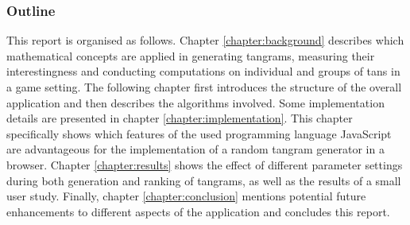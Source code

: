 \subsubsection*{Outline}

This report is organised as follows. Chapter \ref{chapter:background} describes which mathematical concepts are applied in generating tangrams, measuring their interestingness and conducting computations on individual and groups of tans in a game setting. The following chapter first introduces the structure of the overall application and then describes the algorithms involved. Some implementation details are presented in chapter \ref{chapter:implementation}. This chapter specifically shows which features of the used programming language JavaScript are advantageous for the implementation of a random tangram generator in a browser. Chapter \ref{chapter:results} shows the effect of different parameter settings during both generation and ranking of tangrams, as well as the results of a small user study. Finally, chapter \ref{chapter:conclusion} mentions potential future enhancements to different aspects of the application and concludes this report.

